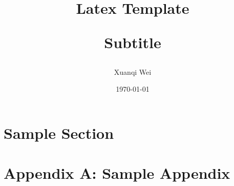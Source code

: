 \documentclass[12pt]{article}
\title{Latex Template \\
\begin{large} 
  Subtitle
\end{large} 
}
\author{Xuanqi Wei}
\date{\today}
\begin{document}
\maketitle
\thispagestyle{empty}

\newpage

\tableofcontents
\thispagestyle{empty}

\newpage

\setcounter{page}{1}

\section{Sample Section}

\printbibliography

\newpage

\appendix
\section*{Appendix A: Sample Appendix}
\end{document}
